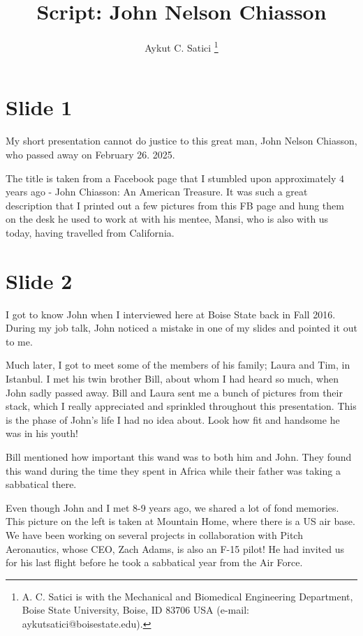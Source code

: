\documentclass[journal,twoside,web]{ieeecolor}
\begin{document}
\title{Script: John Nelson Chiasson} 
\author{
    Aykut C. Satici 
    \thanks{A. C. Satici is with the Mechanical and Biomedical Engineering Department, Boise State University, Boise, ID 83706 USA
    (e-mail: aykutsatici@boisestate.edu).}
}
\maketitle

\section{Slide 1}
%
My short presentation cannot do justice to this great man, John Nelson Chiasson, who passed away on February 26. 2025.

The title is taken from a Facebook page that I stumbled upon approximately $4$ 
years ago - John Chiasson: An American Treasure. It was such a great description
that I printed out a few pictures from this FB page and hung them 
on the desk he used to work at with his mentee, Mansi, who is also with us
today, having travelled from California.

\section{Slide 2}

I got to know John when I interviewed here at Boise State back in Fall 2016. 
During my job talk, John noticed a mistake in one of my slides and pointed it out to me.

Much later, I got to meet some of the members of his family; Laura and Tim, in 
Istanbul. I met his twin brother Bill, about whom I had heard so much, when John
sadly passed away. Bill and Laura sent me a bunch of pictures from their stack, 
which I really appreciated and sprinkled throughout this presentation. This is 
the phase of John's life I had no idea about. Look how fit and handsome he was 
in his youth!

Bill mentioned how important this wand was to both him and John. They found this
wand during the time they spent in Africa while their father was taking a
sabbatical there.

Even though John and I met 8-9 years ago, we shared a lot of fond memories. This
picture on the left is taken at Mountain Home, where there is a US air base. We 
have been working on several projects in collaboration with Pitch Aeronautics, 
whose CEO, Zach Adams, is also an F-15 pilot! He had invited us for his last 
flight before he took a sabbatical year from the Air Force.
\end{document}
